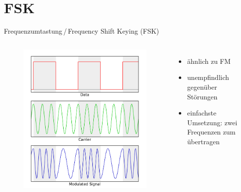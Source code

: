 \section{FSK}
\begin{frame}{Frequenzumtastung\,/\,Frequency Shift Keying (FSK)}
  \begin{columns}
    \begin{figure}
      \includegraphics[width=\textwidth,height=.8\textheight,keepaspectratio]{a15/Fsk.png}
    \end{figure}
    \begin{itemize}
      \item ähnlich zu FM
      \item unempfindlich gegenüber Störungen
      \item einfachste Umsetzung: zwei Frequenzen zum übertragen
    \end{itemize}
  \end{columns}
\end{frame}

